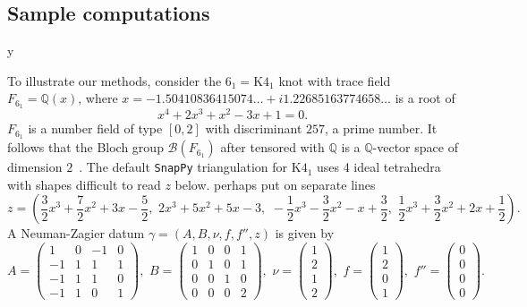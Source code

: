 \documentclass[12pt]{amsart}
\theoremstyle{definition}
\def\printname#1{
        \if\draft y
                \smash{\makebox[0pt]{\hspace{-0.5in}
                        \raisebox{8pt}{\tt\tiny #1}}}
        \fi
}
\def\lbl#1{\label{#1}\printname{#1}}
\def\BQ{\mathbb Q}
\def\ga{\gamma}
\def\calB{\mathcal{B}}
\def\calB{\mathcal{B}}
\begin{document}
\subsection{Sample computations}
\lbl{sub.sample}

To illustrate our methods, consider the $6_1=\mathrm{K4}_1$ knot with trace
field $F_{6_1}=\BQ(x)$, where $x=-1.50410836415074\dots 
+ i 1.22685163774658\dots $ 
is a root of
$$
x^4 + 2 x^3 + x^2 - 3 x + 1 = 0.
$$
$F_{6_1}$ is a number field of type $[0,2]$ with discriminant $257$, a prime
number. It follows that the Bloch group $\calB(F_{6_1})$ after tensored
with $\BQ$ is a $\BQ$-vector space of dimension $2$~\cite{suslin}.
The default \texttt{SnapPy} triangulation for $\mathrm{K4}_1$ uses 4 ideal
tetrahedra with shapes {\color{red} difficult to read $z$ below. perhaps put on separate lines}
$$
z=\left(\frac{3}{2} x^{3} + \frac{7}{2} x^{2} + 3 x - \frac{5}{2}, \,\,
2 x^{3} + 5 x^{2} + 5 x - 3, \,\,
-\frac{1}{2} x^{3} - \frac{3}{2} x^{2} - x + \frac{3}{2}, \,\,
\frac{1}{2} x^{3} + \frac{3}{2} x^{2} + 2 x + \frac{1}{2} \right).
$$
A Neuman-Zagier datum $\ga=(A,B,\nu,f,f'',z)$ is given by
$$
A = \left(\begin{array}{rrrr}
1 & 0 & -1 & 0 \\
-1 & 1 & 1 & 1 \\
-1 & 1 & 1 & 0 \\
-1 & 1 & 0 & 1
\end{array}\right), \,\,
B = \left(\begin{array}{rrrr}
1 & 0 & 0 & 1 \\
0 & 1 & 0 & 1 \\
0 & 0 & 1 & 0 \\
0 & 0 & 0 & 2
\end{array}\right), \,\, 
\nu = \left(\begin{array}{r} 
1 \\ 2 \\ 1 \\ 2 
\end{array}\right), \,\, 
f = \left(\begin{array}{r} 
1 \\ 2 \\ 0 \\ 1
\end{array}\right), \,\, 
f'' = \left(\begin{array}{r} 
0 \\ 0 \\ 0 \\ 0
\end{array}\right).
$$
\end{document}
